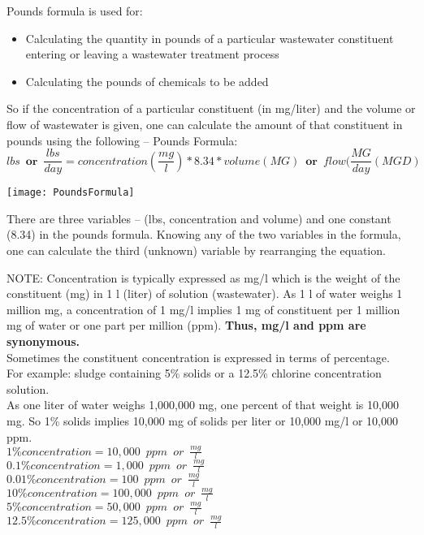 Pounds formula is used for:
\begin{itemize}
\item Calculating the quantity in pounds of a particular wastewater constituent entering or leaving a wastewater treatment process
\item Calculating the pounds of chemicals to be added\\
\end{itemize}
So if the concentration of a particular constituent (in mg/liter) and the volume or flow of wastewater is given, one can calculate the amount of that constituent in pounds using the following – Pounds Formula:
$$lbs \enspace \textbf{or} \enspace \frac{lbs}{day}=concentration(\frac{mg}{l})*8.34*volume(MG) \enspace \textbf{or} \enspace flow(\frac{MG}{day}(MGD)$$

\begin{center}
\texttt{[image: PoundsFormula]}
\end{center}

There are three variables – (lbs, concentration and volume) and one constant (8.34) in the pounds formula.  Knowing any of the two variables in the formula, one can calculate the third (unknown) variable by rearranging the equation.

NOTE:  Concentration is typically expressed as mg/l which is the weight of the constituent (mg) in 1 l (liter) of solution (wastewater).  As 1 l of water weighs 1 million mg, a concentration of 1 mg/l implies 1 mg of constituent per 1 million mg of water or one part per million (ppm).   \textbf{Thus, mg/l and ppm are synonymous.}\\  
Sometimes the constituent concentration is expressed in terms of percentage.\\
\vspace{6pt}
For example:  sludge containing 5\% solids or a 12.5\% chlorine concentration solution.\\
\vspace{6pt}
As one liter of water weighs 1,000,000 mg, one percent of that weight is 10,000 mg.  So 1\% solids implies 10,000 mg of solids per liter or 10,000 mg/l or 10,000 ppm.\\
\vspace{6pt}
$1\% concentration = 10,000 \enspace ppm \enspace or \enspace\frac{mg}{l}$\\
$0.1\% concentration = 1,000 \enspace ppm \enspace or \enspace \frac{mg}{l}$\\
$0.01\% concentration = 100 \enspace ppm \enspace or \enspace \frac{mg}{l}$\\
$10\% concentration = 100,000 \enspace ppm \enspace or \enspace \frac{mg}{l}$\\
$5\% concentration = 50,000 \enspace ppm \enspace or \enspace \frac{mg}{l}$\\
$12.5\% concentration = 125,000 \enspace ppm \enspace or \enspace \frac{mg}{l}$\\

